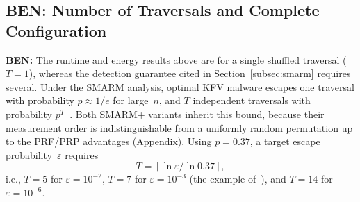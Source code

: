 \documentclass{ieeeaccess}
\DeclareRobustCommand{\ben}[1]{{\color{BENcolor}\textbf{BEN:} #1}}
\newcommand{\rtsmarm}{SMARM+\xspace}
\begin{document}
\subsection{\ben{Number of Traversals and Complete Configuration}}
\label{sec:traversals}


\begin{table}[!ht]
  \centering
  \small
  \setlength{\tabcolsep}{3.5pt}
  \caption{\ben{Escape probability of optimal KFV malware ($0.37^T$~\cite{smarm}) and the resulting attestation runtime and board-level energy per round for $T$ traversals at $B = 1024$~bytes over $|M| = 512$~KiB, derived as $T$ times the single-traversal measurements of Tables~\ref{tab:runtime_overhead} and~\ref{tab:energy}. The shaded row is the smallest $T$ meeting the $10^{-3}$ target of~\cite{smarm}.}}
  \label{tab:traversals}
\end{table}

\ben{The runtime and energy results above are for a single shuffled traversal ($T = 1$), whereas the detection guarantee cited in Section~\ref{subsec:smarm} requires several.
Under the SMARM analysis, optimal KFV malware escapes one traversal with probability $p \approx 1/e$ for large~$n$, and $T$ independent traversals with probability $p^T$~\cite{smarm}.
Both \rtsmarm variants inherit this bound, because their measurement order is indistinguishable from a uniformly random permutation up to the PRF/PRP advantages (Appendix).
Using $p = 0.37$, a target escape probability~$\varepsilon$ requires
\[
  T = \left\lceil \ln \varepsilon / \ln 0.37 \right\rceil,
\]
i.e., $T = 5$ for $\varepsilon = 10^{-2}$, $T = 7$ for $\varepsilon = 10^{-3}$ (the example of~\cite{smarm}), and $T = 14$ for $\varepsilon = 10^{-6}$.}
\end{document}
